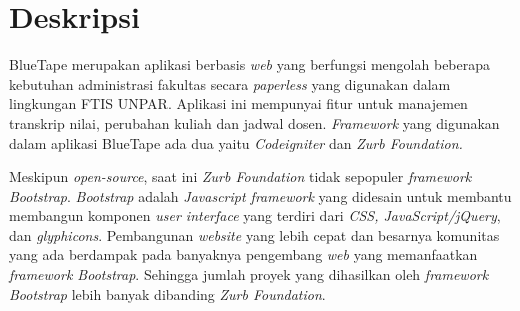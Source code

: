 \documentclass[a4paper,twoside]{article}
\begin{document}
\title{\@judultopik}
\author{\nama \textendash \@npm} 

\newcommand{\nama}{Hapsari Laksmi W}
\newcommand{\@npm}{2015730037}
\newcommand{\@judultopik}{Migrasi Zurb Foundation ke Bootstrap 4} %
\newcommand{\jumpemb}{1} %
\newcommand{\tanggal}{24/08/2019}


\maketitle


\section{Deskripsi}

BlueTape merupakan aplikasi berbasis \textit{web} yang berfungsi mengolah beberapa kebutuhan administrasi fakultas secara \textit{paperless} yang digunakan dalam lingkungan FTIS UNPAR.  Aplikasi ini mempunyai fitur untuk manajemen transkrip nilai, perubahan kuliah dan jadwal dosen. \textit{Framework} yang digunakan dalam aplikasi BlueTape ada dua yaitu \textit{Codeigniter} dan \textit{Zurb Foundation.}  

Meskipun \textit{open-source}, saat ini \textit{Zurb Foundation} tidak sepopuler \textit{framework} \textit{Bootstrap}. 
\textit{Bootstrap} adalah \textit{ Javascript framework} yang didesain untuk membantu membangun komponen \textit{user interface} yang terdiri dari \textit{CSS, JavaScript/jQuery}, dan \textit{glyphicons}. Pembangunan \textit{website} yang lebih cepat dan besarnya komunitas yang ada berdampak pada banyaknya pengembang \textit{web} yang memanfaatkan \textit{framework Bootstrap}. Sehingga jumlah proyek yang dihasilkan oleh\textit{ framework Bootstrap} lebih banyak dibanding \textit{Zurb Foundation}. 

%
\end{document}
